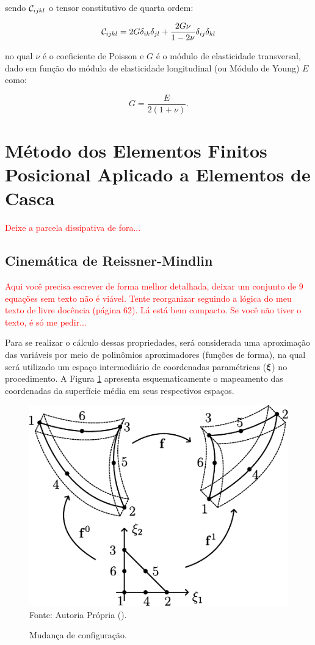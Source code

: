 \noindent sendo $\mathcal{C}_{ijkl}$ o tensor constitutivo de quarta ordem:

\begin{equation}
    \mathcal{C}_{ijkl}=2G\delta_{ik}\delta_{jl}+\frac{2G\nu}{1-2\nu}\delta_{ij}\delta_{kl}
\end{equation}

\noindent no qual $\nu$ é o coeficiente de Poisson e $G$ é o módulo de elasticidade transversal, dado em função do módulo de elasticidade longitudinal (ou Módulo de Young) $E$ como:

\begin{equation}
    G=\frac{E}{2(1+\nu)}\text{.}
\end{equation}


\section{Método dos Elementos Finitos Posicional Aplicado a Elementos de Casca} \label{MEFP}

\textcolor{red}{Deixe a parcela dissipativa de fora...}

\subsection{Cinemática de Reissner-Mindlin}

\textcolor{red}{Aqui você precisa escrever de forma melhor detalhada, deixar um conjunto de 9 equações sem texto não é viável. Tente reorganizar seguindo a lógica do meu texto de livre docência (página 62). Lá está bem compacto. Se você não tiver o texto, é só me pedir...}


Para se realizar o cálculo dessas propriedades, será considerada uma aproximação das variáveis por meio de polinômios aproximadores (funções de forma), na qual será utilizado um espaço intermediário de coordenadas paramétricas ($\boldsymbol{\xi}$) no procedimento. A Figura \ref{fig:Mapeamento} apresenta esquematicamente o mapeamento das coordenadas da superfície média em seus respectivos espaços.

\begin{figure}[h!]
    \centering
    \caption{Mudança de configuração.}
    \includegraphics[width=.4\linewidth]{Figuras/Mapeamento.pdf}
    \\Fonte: Autoria Própria (\the\year).
    \label{fig:Mapeamento}
\end{figure}

